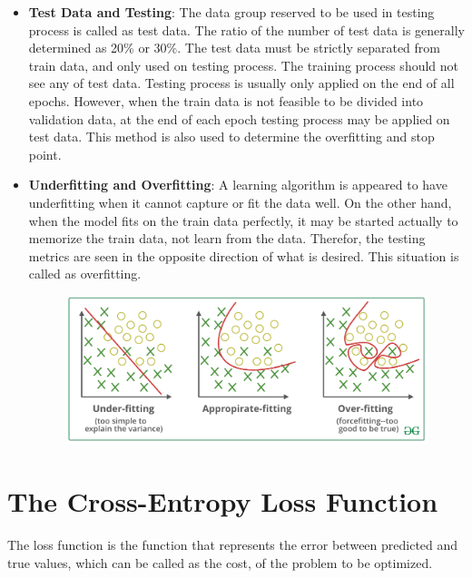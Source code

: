 \begin{itemize}
	\item \textbf{Test Data and Testing}: The data group reserved to be used in testing process is called as test data. The ratio of the number of test data is generally determined as 20\% or 30\%. The test data must be strictly separated from train data, and only used on testing process. The training process should not see any of test data. Testing process is usually only applied on the end of all epochs. However, when the train data is not feasible to be divided into validation data, at the end of each epoch testing process may be applied on test data. This method is also used to determine the overfitting and stop point.
	
	\item \textbf{Underfitting and Overfitting}: A learning algorithm is appeared to have underfitting when it cannot capture or fit the data well. On the other hand, when the model fits on the train data perfectly, it may be started actually to memorize the train data, not learn from the data. Therefor, the testing metrics are seen in the opposite direction of what is desired. This situation is called as overfitting.
	
	\begin{figure}[h]
		\centering
		\includegraphics[width=.8\linewidth]{fig/underfitting_overfitting.png}
		\vspace*{1mm}
		\label{underfitting_overfitting}
	\end{figure}
	
\end{itemize}

\section{The Cross-Entropy Loss Function}\label{sec:CH3_cross_entropy}

The loss function is the function that represents the error between predicted and true values, which can be called as the cost, of the problem to be optimized.

